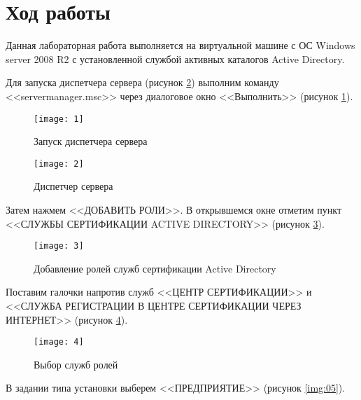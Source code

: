 \section{Ход работы}
    
    Данная лабораторная работа выполняется на виртуальной машине с ОС Windows server 2008 R2 с установленной службой активных каталогов Active Directory.\par
    Для запуска диспетчера сервера (рисунок \ref{img:02}) выполним команду <<servermanager.msc>> через диалоговое окно <<Выполнить>> (рисунок \ref{img:01}).\par
    
	\begin{figure}[h!]
        \centering
        \texttt{[image: 1]}
        \caption{Запуск диспетчера сервера}
        \label{img:01}
    \end{figure}
    
    \begin{figure}[h!]
        \centering
        \texttt{[image: 2]}
        \caption{Диспетчер сервера}
        \label{img:02}
    \end{figure}
    
    Затем нажмем <<ДОБАВИТЬ РОЛИ>>. В открывшемся окне отметим пункт <<СЛУЖБЫ СЕРТИФИКАЦИИ ACTIVE DIRECTORY>> (рисунок \ref{img:03}).\par
    
    \clearpage

    \begin{figure}[h!]
        \centering
        \texttt{[image: 3]}
        \caption{Добавление ролей служб сертификации Active Directory}
        \label{img:03}
    \end{figure}
    
    Поставим галочки напротив служб <<ЦЕНТР СЕРТИФИКАЦИИ>> и <<СЛУЖБА РЕГИСТРАЦИИ В ЦЕНТРЕ СЕРТИФИКАЦИИ ЧЕРЕЗ ИНТЕРНЕТ>> (рисунок \ref{img:04}).\par
    
    \begin{figure}[h!]
        \centering
        \texttt{[image: 4]}
        \caption{Выбор служб ролей}
        \label{img:04}
    \end{figure}
    
    В задании типа установки выберем <<ПРЕДПРИЯТИЕ>> (рисунок \ref{img:05}).\par
    
